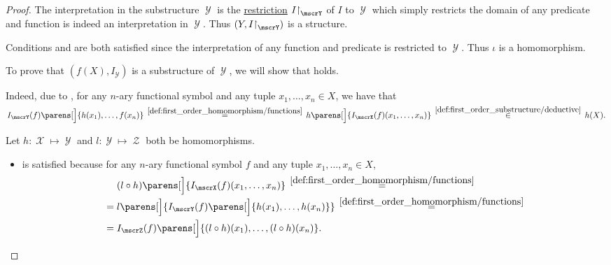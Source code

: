 \begin{proof}
   The interpretation in the substructure \( \mscrY \) is the \hyperref[def:multi_valued_function/restriction]{restriction} \( I\restr_\mscrY \) of \( I \) to \( \mscrY \) which simply restricts the domain of any predicate and function is indeed an interpretation in \( \mscrY \). Thus \( (Y, I\restr_\mscrY) \) is a structure.

  Conditions  and  are both satisfied since the interpretation of any function and predicate is restricted to \( \mscrY \). Thus \( \iota \) is a homomorphism.

   To prove that \( (f(X), I_\mscrY) \) is a substructure of \( \mscrY \), we will show that  holds.

  Indeed, due to , for any \( n \)-ary functional symbol and any tuple \( {x_1, \ldots, x_n \in X} \), we have that
  \begin{equation*}
    I_\mscrY(f) \parens[\Big]{ h(x_1), \ldots, f(x_n) }
    \reloset {\ref{def:first_order_homomorphism/functions}} =
    h\parens[\Big]{ I_\mscrX(f)(x_1, \ldots, x_n) }
    \reloset {\ref{def:first_order_substructure/deductive}} \in
    h(X).
  \end{equation*}

   Let \( h: \mscrX \mapsto \mscrY \) and \( l: \mscrY \mapsto \mscrZ \) both be homomorphisms.

  \begin{itemize}
    \item {} is satisfied because for any \( n \)-ary functional symbol \( f \) and any tuple \( x_1, \ldots, x_n \in X \),
    \begin{align*}
      &\phantom{{}={}}
      (l \bincirc h) \parens[\Big]{ I_\mscrX(f)(x_1, \ldots, x_n) }
      \reloset {\ref{def:first_order_homomorphism/functions}} = \\ &=
      l\parens[\Big]{ I_\mscrY(f) \parens[\Big]{ h(x_1), \ldots, h(x_n) } }
      \reloset {\ref{def:first_order_homomorphism/functions}} = \\ &=
      I_{\mscrZ}(f) \parens[\Big]{ (l \bincirc h)(x_1), \ldots, (l \bincirc h)(x_n) }.
    \end{align*}


\end{itemize}
\end{proof}
